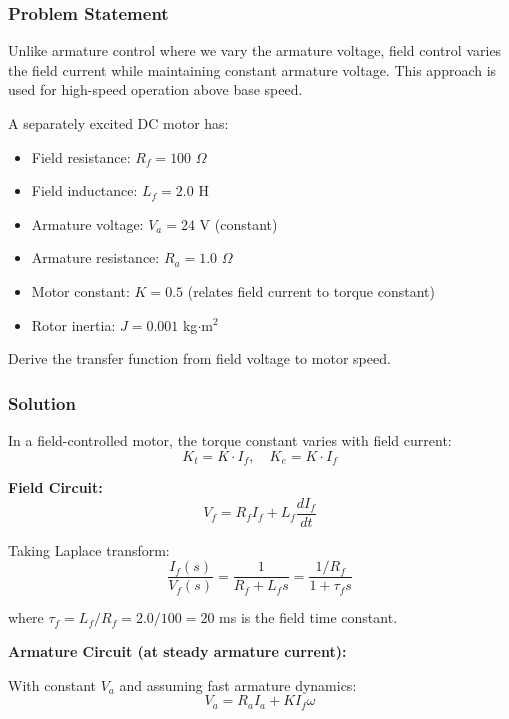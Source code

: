 \subsubsection{Problem Statement}

Unlike armature control where we vary the armature voltage, field control varies the field current while maintaining constant armature voltage. This approach is used for high-speed operation above base speed.

A separately excited DC motor has:
\begin{itemize}
    \item Field resistance: $R_f = 100$ $\Omega$
    \item Field inductance: $L_f = 2.0$ H
    \item Armature voltage: $V_a = 24$ V (constant)
    \item Armature resistance: $R_a = 1.0$ $\Omega$
    \item Motor constant: $K = 0.5$ (relates field current to torque constant)
    \item Rotor inertia: $J = 0.001$ kg$\cdot$m$^2$
\end{itemize}

Derive the transfer function from field voltage to motor speed.

\subsubsection{Solution}

In a field-controlled motor, the torque constant varies with field current:
\begin{equation}
    K_t = K \cdot I_f, \quad K_e = K \cdot I_f
\end{equation}

\textbf{Field Circuit:}
\begin{equation}
    V_f = R_f I_f + L_f \frac{dI_f}{dt}
\end{equation}

Taking Laplace transform:
\begin{equation}
    \frac{I_f(s)}{V_f(s)} = \frac{1}{R_f + L_f s} = \frac{1/R_f}{1 + \tau_f s}
\end{equation}

where $\tau_f = L_f / R_f = 2.0/100 = 20$ ms is the field time constant.

\textbf{Armature Circuit (at steady armature current):}

With constant $V_a$ and assuming fast armature dynamics:
\begin{equation}
    V_a = R_a I_a + K I_f \omega
\end{equation}

